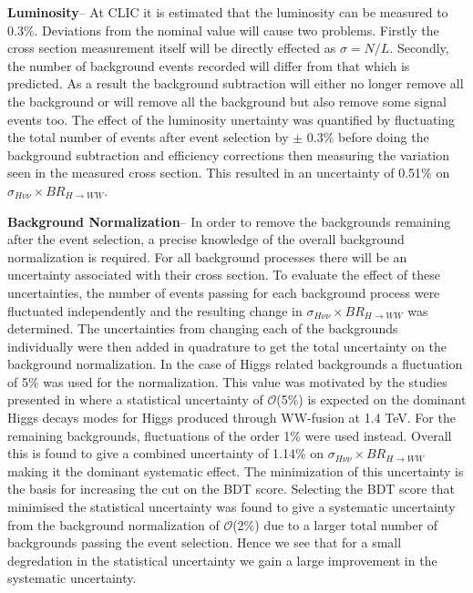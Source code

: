 \textbf{Luminosity}-- At \ac{CLIC} it is estimated that the luminosity can be measured to 0.3\%. Deviations from the nominal value will cause two problems. Firstly the cross section measurement itself will be directly effected as $\sigma=N/L$. Secondly, the number of background events recorded will differ from that which is predicted. As a result the background subtraction will either no longer remove all the background or will remove all the background but also remove some signal events too. The effect of the luminosity unertainty was quantified by fluctuating the total number of events after event selection by $\pm$ 0.3\% before doing the background subtraction and efficiency corrections then measuring the variation seen in the measured cross section. This resulted in an uncertainty of 0.51\% on $\sigma_{H\nu\nu}\times BR_{H\rightarrow WW}$.

\textbf{Background Normalization}-- In order to remove the backgrounds remaining after the event selection, a precise knowledge of the overall background normalization is required. For all background processes there will be an uncertainty associated with their cross section. To evaluate the effect of these uncertainties, the number of events passing for each background process were fluctuated independently and the resulting change in $\sigma_{H\nu\nu}\times BR_{H\rightarrow WW}$ was determined. The uncertainties from changing each of the backgrounds individually were then added in quadrature to get the total uncertainty on the background normalization. In the case of Higgs related backgrounds a fluctuation of 5\% was used for the normalization. This value was motivated by the studies presented in  \cite{Abramowicz:2016zbo} where a statistical uncertainty of $\mathcal{O}$(5\%) is expected on the dominant Higgs decays modes for Higgs produced through WW-fusion at 1.4 TeV. For the remaining backgrounds, fluctuations of the order 1\% were used instead. Overall this is found to give a combined uncertainty of 1.14\% on $\sigma_{H\nu\nu}\times BR_{H\rightarrow WW}$ making it the dominant systematic effect. The minimization of this uncertainty is the basis for increasing the cut on the BDT score. Selecting the BDT score that minimised the statistical uncertainty was found to give a systematic uncertainty from the background normalization of $\mathcal{O}$(2\%) due to a larger total number of backgrounds passing the event selection. Hence we see that for a small degredation in the statistical uncertainty we gain a large improvement in the systematic uncertainty.

